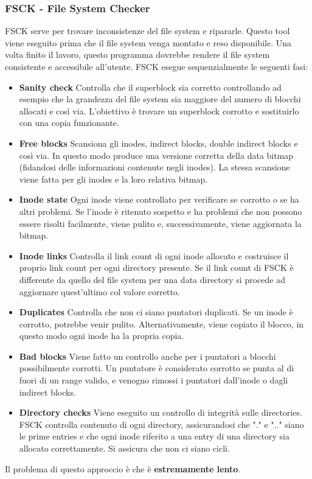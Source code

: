\documentclass[12pt, letterpaper]{article}
\begin{document}
			\subsubsection{FSCK - File System Checker}
				FSCK serve per trovare inconsistenze del file system e ripararle. Questo tool viene eseguito prima che il file system venga montato e reso disponibile. Una volta finito il lavoro, questo programma dovrebbe rendere il file system consistente e accessibile all'utente. FSCK esegue sequenzialmente le seguenti fasi:
				\begin{itemize}
					\item \textbf{Sanity check} Controlla che il superblock sia corretto controllando ad esempio che la grandezza del file system sia maggiore del numero di blocchi allocati e così via. L'obiettivo è trovare un superblock corrotto e sostituirlo con una copia funzionante.
					\item \textbf{Free blocks} Scansiona gli inodes, indirect blocks, double indirect blocks e così via. In questo modo produce una versione corretta della data bitmap (fidandosi delle informazioni contenute negli inodes). La stessa scansione viene fatta per gli inodes e la loro relativa bitmap.
					\item \textbf{Inode state} Ogni inode viene controllato per verificare se corrotto o se ha altri problemi. Se l'inode è ritenuto sospetto e ha problemi che non possono essere risolti facilmente, viene pulito e, successivamente, viene aggiornata la bitmap.
					\item \textbf{Inode links} Controlla il link count di ogni inode allocato e costruisce il proprio link count per ogni directory presente. Se il link count di FSCK è differente da quello del file system per una data directory si procede ad aggiornare quest'ultimo col valore corretto.
					\item \textbf{Duplicates} Controlla che non ci siano puntatori duplicati. Se un inode è corrotto, potrebbe venir pulito. Alternativamente, viene copiato il blocco, in questo modo ogni inode ha la propria copia.
					\item \textbf{Bad blocks} Viene fatto un controllo anche per i puntatori a blocchi possibilmente corrotti. Un puntatore è considerato corrotto se punta al di fuori di un range valido, e venogno rimossi i puntatori dall'inode o dagli indirect blocks.
					\item \textbf{Directory checks} Viene eseguito un controllo di integrità sulle directories. FSCK controlla contenuto di ogni directory, assicurandosi che "." e ".." siano le prime entries e che ogni inode riferito a una entry di una directory sia allocato correttamente. Si assicura che non ci siano cicli.
				\end{itemize}
				Il problema di questo approccio è che è \textbf{estremamente lento}.
				
\end{document}
